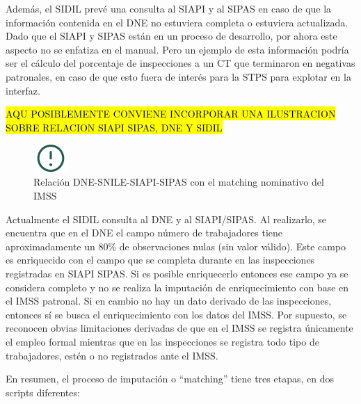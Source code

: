 \documentclass[
]{article}
\begin{document}
Además, el SIDIL prevé una consulta al SIAPI y al SIPAS en caso de que la información contenida en el DNE no estuviera completa o estuviera actualizada. Dado que el SIAPI y SIPAS están en un proceso de desarrollo, por ahora este aspecto no se enfatiza en el manual. Pero un ejemplo de esta información podría ser el cálculo del porcentaje de inspecciones a un CT que terminaron en negativas patronales, en caso de que esto fuera de interés para la STPS para explotar en la interfaz.

\hl{AQU POSIBLEMENTE CONVIENE INCORPORAR UNA ILUSTRACION SOBRE RELACION SIAPI SIPAS, DNE Y SIDIL}

\begin{figure}
\includegraphics[width=50px,style="float:left; background-color: #fff; padding-right:1em"]{images-1/important-icon} \caption{Relación DNE-SNILE-SIAPI-SIPAS con el matching nominativo del IMSS}\label{fig:relacionDNESNILESIAPISIPAS}
\end{figure}

\begin{rmdcomment}
Actualmente el SIDIL consulta al DNE y al SIAPI/SIPAS. Al realizarlo, se
encuentra que en el DNE el campo número de trabajadores tiene
aproximadamente un 80\% de observaciones nulas (sin valor válido). Este
campo es enriquecido con el campo que se completa durante en las
inspecciones registradas en SIAPI SIPAS. Si es posible enriquecerlo
entonces ese campo ya se considera completo y no se realiza la
imputación de enriquecimiento con base en el IMSS patronal. Si en cambio
no hay un dato derivado de las inspecciones, entonces sí se busca el
enriquecimiento con los datos del IMSS. Por supuesto, se reconocen
obvias limitaciones derivadas de que en el IMSS se registra únicamente
el empleo formal mientras que en las inspecciones se registra todo tipo
de trabajadores, estén o no registrados ante el IMSS.
\end{rmdcomment}

En resumen, el proceso de imputación o ``matching'' tiene tres etapas, en dos scripts diferentes:
\end{document}
